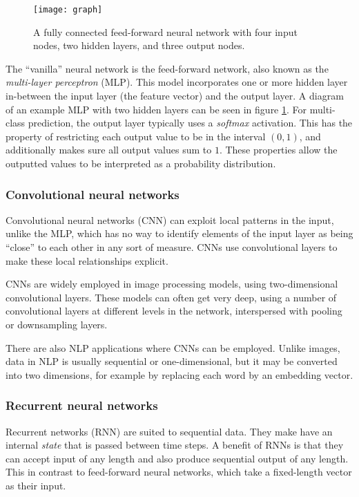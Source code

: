 \begin{figure}
  \centering
  \texttt{[image: graph]}
  \caption{A fully connected feed-forward neural network with four input
  nodes, two hidden layers, and three output nodes.}
  \label{mlp-diagram}
\end{figure}

The ``vanilla'' neural network is the feed-forward network, also known as the
\emph{multi-layer perceptron} (MLP). This model incorporates one or more
hidden layer in-between the input layer (the feature vector) and the output
layer. A diagram of an example MLP with two hidden layers can be seen in
figure \ref{mlp-diagram}. For multi-class prediction, the output layer
typically uses a \emph{softmax} activation. This has the property of
restricting each output value to be in the interval $(0,1)$, and additionally
makes sure all output values sum to $1$. These properties allow the outputted
values to be interpreted as a probability distribution.


\subsubsection{Convolutional neural networks}

Convolutional neural networks (CNN) can exploit local patterns in the input,
unlike the MLP, which has no way to identify elements of the input layer as
being ``close'' to each other in any sort of measure. CNNs use convolutional
layers to make these local relationships explicit.

CNNs are widely employed in image processing models, using
two-di\-men\-sional convolutional layers. These models can often get very
deep, using a number of convolutional layers at different levels in the
network, interspersed with pooling or downsampling layers.

There are also NLP applications where CNNs can be employed. Unlike images,
data in NLP is usually sequential or one-dimensional, but it may be converted
into two dimensions, for example by replacing each word by an embedding
vector.


\subsubsection{Recurrent neural networks}

Recurrent networks (RNN) are suited to sequential data. They make have an
internal \emph{state} that is passed between time steps. A benefit of RNNs is
that they can accept input of any length and also produce sequential output
of any length. This in contrast to feed-forward neural networks, which take a
fixed-length vector as their input.

